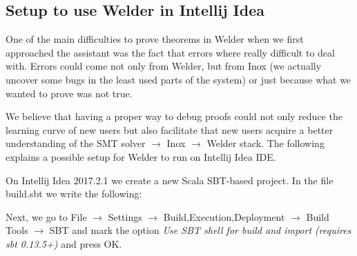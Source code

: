 \subsection{Setup to use Welder in Intellij Idea}

One of the main difficulties to prove theorems in Welder when we first approached the assistant was the fact that errors where really difficult to deal with. Errors could come not only from Welder, but from Inox (we actually uncover some bugs in the least used parts of the system) or just because what we wanted to prove was not true. 

We believe that having a proper way to debug proofs could not only reduce the learning curve of new users but also facilitate that new users acquire a better understanding of the SMT solver $\to$ Inox $\to$ Welder stack. The following explains a possible setup for Welder to run on Intellij Idea IDE. 

On Intellij Idea 2017.2.1 we create a new Scala SBT-based project. In the file build.sbt we write the following:

\begin{figure}[H]
\centering
{}
\end{figure}

Next, we go to File $\to$ Settings $\to$ Build,Execution,Deployment $\to$ Build Tools $\to$ SBT and mark the option \textit{Use SBT shell for build and import (requires sbt 0.13.5+)} and press OK.

\begin{figure}[H]
\centering
{}
\end{figure}

